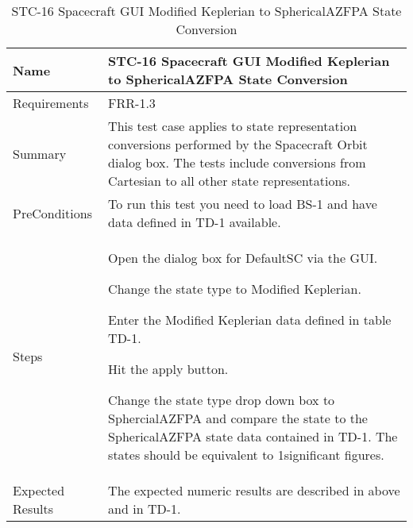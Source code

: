 
\begin{table}[htbp!]
\centering
      \begin{tabular}{|p{1.05 in} |p{4.75 in} |}
      \hline
         \rowcolor[rgb]{0.8,0.8,0.8} Name & STC-16 Spacecraft GUI Modified Keplerian to SphericalAZFPA State Conversion\\
         \hline
         Requirements & FRR-1.3\\ \hline
         Summary &
         This test case applies to state representation conversions performed by the Spacecraft Orbit dialog box.   The tests include conversions from Cartesian to all other state representations.\\
         \hline
         PreConditions & To run this test you need to load BS-1 and have data defined in TD-1 available.\\
         \hline
         Steps &
         \begin{compactenum}
         \item Open the dialog box for DefaultSC via the GUI.
         \item Change the state type to Modified Keplerian.
         \item Enter the Modified Keplerian data defined in table TD-1.
         \item Hit the apply button.
         \item Change the state type drop down box to SphercialAZFPA and compare the state to the
         SphericalAZFPA state data contained in TD-1. The states should be equivalent to 1significant figures.
         \end{compactenum}\\
         \hline
         Expected Results & The expected numeric results are described in above and in TD-1.\\
      \hline
\end{tabular}
      \label{Table: STC-16}
      \caption{STC-16 Spacecraft GUI Modified Keplerian to SphericalAZFPA State Conversion}
\end{table} 
